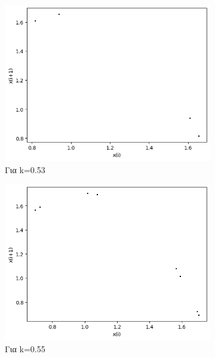 \begin{figure}[h!]
\begin{subfigure}[b]{0.25\textwidth}
		\includegraphics[width=\textwidth]{LateX images/graphs q05/g5}
		\caption{Για k=0.53}
		\label{f:k29}
	\end{subfigure}
	\begin{subfigure}[b]{0.25\textwidth}
		\centering
		\includegraphics[width=\textwidth]{LateX images/graphs q05/g6}
		\caption{Για k=0.55}
		\label{f:k30}
	\end{subfigure}
	\hfill
	\begin{subfigure}[b]{0.25\textwidth}
		\centering

\end{subfigure}
\end{figure}
